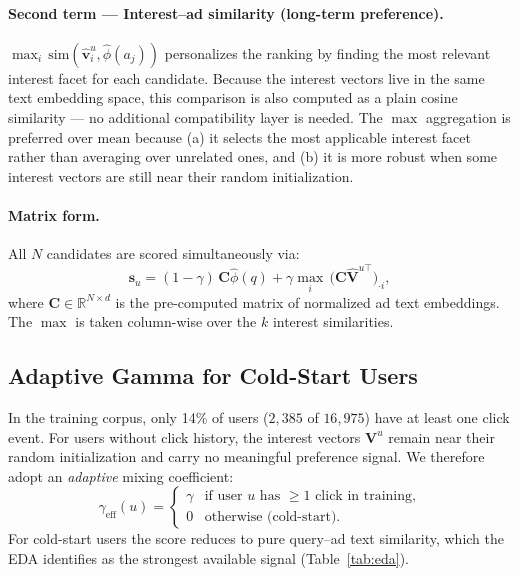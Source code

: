 \documentclass[10pt,twocolumn]{article}
\newcommand{\R}{\mathbb{R}}
\newcommand{\cosim}{\mathrm{sim}}
\begin{document}
\paragraph{Second term --- Interest--ad similarity (long-term preference).}
$\max_{i}\,\cosim(\hat{\bm{v}}^u_i, \hat{\phi}(a_j))$ personalizes the
ranking by finding the most relevant interest facet for each candidate.
Because the interest vectors live in the same text embedding space,
this comparison is also computed as a plain cosine similarity ---
no additional compatibility layer is needed.
The $\max$ aggregation is preferred over $\text{mean}$ because
(a) it selects the most applicable interest facet rather than
averaging over unrelated ones, and
(b) it is more robust when some interest vectors are still near
their random initialization.

\paragraph{Matrix form.}
All $N$ candidates are scored simultaneously via:
\[
  \bm{s}_u = (1-\gamma)\,\bm{C}\hat{\phi}(q)
           + \gamma \max_{i}\,\bigl(\bm{C}\hat{\bm{V}}^{u\top}\bigr)_{\cdot i},
\]
where $\bm{C} \in \R^{N \times d}$ is the pre-computed matrix of
normalized ad text embeddings.
The $\max$ is taken column-wise over the $k$ interest similarities.

\subsection{Adaptive Gamma for Cold-Start Users}
\label{sec:adaptive}

In the training corpus, only 14\% of users ($2{,}385$ of $16{,}975$)
have at least one click event.
For users without click history, the interest vectors $\bm{V}^u$ remain
near their random initialization and carry no meaningful preference
signal.
We therefore adopt an \emph{adaptive} mixing coefficient:
\begin{equation}
  \gamma_{\text{eff}}(u) =
  \begin{cases}
    \gamma & \text{if user } u \text{ has } \geq\!1 \text{ click in training,} \\
    0      & \text{otherwise (cold-start).}
  \end{cases}
  \label{eq:adaptive}
\end{equation}
For cold-start users the score reduces to pure query--ad text similarity,
which the EDA identifies as the strongest available signal
(Table~\ref{tab:eda}).
\end{document}
